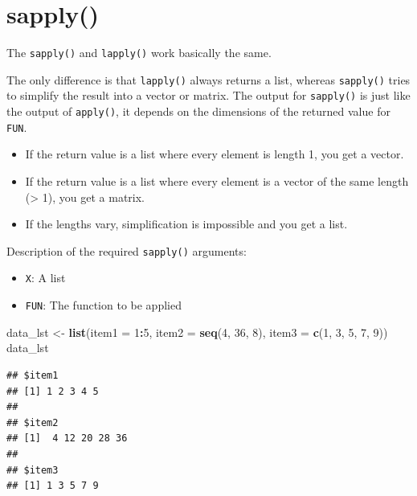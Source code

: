 \documentclass[
]{book}
\newenvironment{Shaded}{\begin{snugshade}}{\end{snugshade}}
\newcommand{\DataTypeTok}[1]{\textcolor[rgb]{0.13,0.29,0.53}{#1}}
\newcommand{\DecValTok}[1]{\textcolor[rgb]{0.00,0.00,0.81}{#1}}
\newcommand{\KeywordTok}[1]{\textcolor[rgb]{0.13,0.29,0.53}{\textbf{#1}}}
\newcommand{\NormalTok}[1]{#1}
\newcommand{\OperatorTok}[1]{\textcolor[rgb]{0.81,0.36,0.00}{\textbf{#1}}}
\newcommand{\StringTok}[1]{\textcolor[rgb]{0.31,0.60,0.02}{#1}}
\providecommand{\tightlist}{%
  \setlength{\itemsep}{0pt}\setlength{\parskip}{0pt}}
\begin{document}
\hypertarget{sapply}{%
\section{sapply()}\label{sapply}}

The \texttt{sapply()} and \texttt{lapply()} work basically the same.

The only difference is that \texttt{lapply()} always returns a list, whereas \texttt{sapply()} tries to simplify the result into a vector or matrix. The output for \texttt{sapply()} is just like the output of \texttt{apply()}, it depends on the dimensions of the returned value for \texttt{FUN}.

\begin{itemize}
\item
  If the return value is a list where every element is length 1, you get a vector.
\item
  If the return value is a list where every element is a vector of the same length (\textgreater{} 1), you get a matrix.
\item
  If the lengths vary, simplification is impossible and you get a list.
\end{itemize}

Description of the required \texttt{sapply()} arguments:

\begin{itemize}
\tightlist
\item
  \texttt{X}: A list
\item
  \texttt{FUN}: The function to be applied
\end{itemize}

\begin{Shaded}
\begin{Highlighting}[]
\NormalTok{data_lst <-}\StringTok{ }\KeywordTok{list}\NormalTok{(}\DataTypeTok{item1 =} \DecValTok{1}\OperatorTok{:}\DecValTok{5}\NormalTok{,}
    \DataTypeTok{item2 =} \KeywordTok{seq}\NormalTok{(}\DecValTok{4}\NormalTok{, }\DecValTok{36}\NormalTok{,}
        \DecValTok{8}\NormalTok{), }\DataTypeTok{item3 =} \KeywordTok{c}\NormalTok{(}\DecValTok{1}\NormalTok{,}
        \DecValTok{3}\NormalTok{, }\DecValTok{5}\NormalTok{, }\DecValTok{7}\NormalTok{, }\DecValTok{9}\NormalTok{))}
\NormalTok{data_lst}
\end{Highlighting}
\end{Shaded}

\begin{verbatim}
## $item1
## [1] 1 2 3 4 5
## 
## $item2
## [1]  4 12 20 28 36
## 
## $item3
## [1] 1 3 5 7 9
\end{verbatim}
\end{document}
